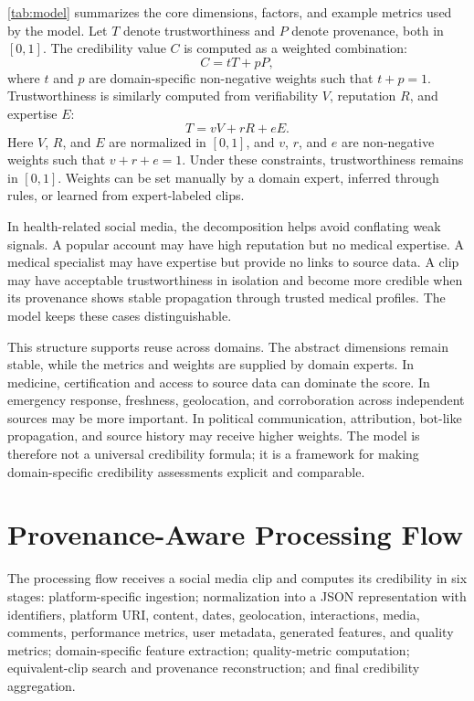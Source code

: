 \documentclass[sigconf, nonacm]{acmart}
\begin{document}
\autoref{tab:model} summarizes the core dimensions, factors, and example metrics
used by the model. Let $T$ denote trustworthiness and $P$ denote provenance, both
in $[0,1]$. The
credibility value $C$ is computed as a weighted combination:
\begin{equation}
  C = tT + pP,
\end{equation}
where $t$ and $p$ are domain-specific non-negative weights such that
$t+p=1$. Trustworthiness is similarly computed from verifiability $V$,
reputation $R$, and expertise $E$:
\begin{equation}
  T = vV + rR + eE.
\end{equation}
Here $V$, $R$, and $E$ are normalized in $[0,1]$, and $v$, $r$, and $e$ are
non-negative weights such that $v+r+e=1$. Under these constraints,
trustworthiness remains in $[0,1]$. Weights can be set manually by a domain
expert, inferred through rules, or learned from expert-labeled clips.

In health-related social media, the decomposition helps avoid conflating weak
signals. A popular account may have high reputation but no medical
expertise. A medical specialist may have expertise but provide no links to source
data. A clip may have acceptable trustworthiness in isolation and become more
credible when its provenance shows stable propagation through trusted medical
profiles. The model keeps these cases distinguishable.

This structure supports reuse across domains. The abstract dimensions remain
stable, while the metrics and weights are supplied by domain experts. In
medicine, certification and access to source data can dominate the score. In
emergency response, freshness, geolocation, and corroboration across independent
sources may be more important. In political communication, attribution, bot-like
propagation, and source history may receive higher weights. The model is
therefore not a universal credibility formula; it is a framework for making
domain-specific credibility assessments explicit and comparable.

\section{Provenance-Aware Processing Flow}

The processing flow receives a social media clip and computes its credibility in
six stages: platform-specific ingestion; normalization into a JSON representation
with identifiers, platform URI, content, dates, geolocation, interactions, media,
comments, performance metrics, user metadata, generated features, and quality
metrics; domain-specific feature extraction; quality-metric computation;
equivalent-clip search and provenance reconstruction; and final credibility
aggregation.
\end{document}
